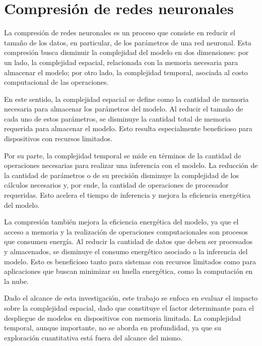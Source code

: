 \section{Compresión de redes neuronales}
\label{sec:compresion_de_redes}

La compresión de redes neuronales es un proceso que consiste en reducir el tamaño de los datos, en particular, de los parámetros de una red neuronal. Esta compresión busca disminuir la complejidad del modelo en dos dimensiones: por un lado, la complejidad espacial, relacionada con la memoria necesaria para almacenar el modelo; por otro lado, la complejidad temporal, asociada al costo computacional de las operaciones.

En este sentido, la complejidad espacial se define como la cantidad de memoria necesaria para almacenar los parámetros del modelo. Al reducir el tamaño de cada uno de estos parámetros, se disminuye la cantidad total de memoria requerida para almacenar el modelo. Esto resulta especialmente beneficioso para dispositivos con recursos limitados.

Por su parte, la complejidad temporal se mide en términos de la cantidad de operaciones necesarias para realizar una inferencia con el modelo. La reducción de la cantidad de parámetros o de su precisión disminuye la complejidad de los cálculos necesarios y, por ende, la cantidad de operaciones de procesador requeridas. Esto acelera el tiempo de inferencia y mejora la eficiencia energética del modelo.

La compresión también mejora la eficiencia energética del modelo, ya que el acceso a memoria y la realización de operaciones computacionales son procesos que consumen energía. Al reducir la cantidad de datos que deben ser procesados y almacenados, se disminuye el consumo energético asociado a la inferencia del modelo. Esto es beneficioso tanto para sistemas con recursos limitados como para aplicaciones que buscan minimizar su huella energética, como la computación en la nube.

Dado el alcance de esta investigación, este trabajo se enfoca en evaluar el impacto sobre la complejidad espacial, dado que constituye el factor determinante para el despliegue de modelos en dispositivos con memoria limitada. La complejidad temporal, aunque importante, no se aborda en profundidad, ya que su exploración cuantitativa está fuera del alcance del mismo.

